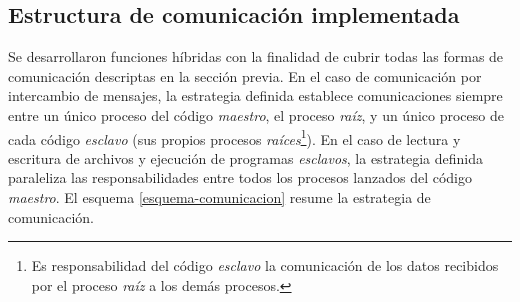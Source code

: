 \subsection*{Estructura de comunicación implementada}
\label{2:estructura}

Se desarrollaron funciones híbridas con la finalidad de cubrir todas las formas de comunicación descriptas en la sección previa.
En el caso de comunicación por intercambio de mensajes, 
la estrategia definida establece comunicaciones siempre entre un único proceso del código \textit{maestro}, el proceso \textit{raíz},
y un único proceso de cada código \textit{esclavo} (sus propios procesos \textit{raíces}\footnote{
Es responsabilidad del código \textit{esclavo} la comunicación de los datos recibidos por el proceso \textit{raíz} a los demás procesos.
}).
En el caso de lectura y escritura de archivos y ejecución de programas \textit{esclavos},
la estrategia definida paraleliza las responsabilidades entre todos los procesos lanzados del código \textit{maestro}.
El esquema \ref{esquema-comunicacion} resume la estrategia de comunicación.


